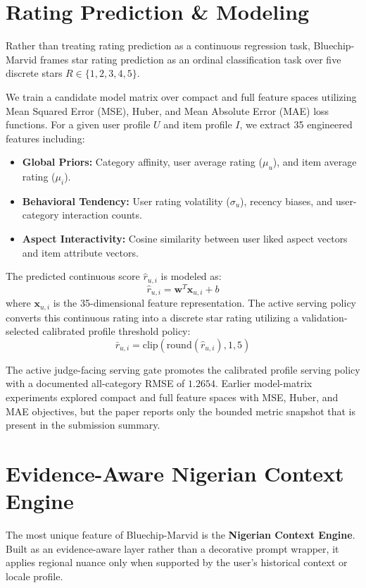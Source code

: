 \documentclass[11pt,a4paper]{article}
\begin{document}
\section{Rating Prediction \& Modeling}
Rather than treating rating prediction as a continuous regression task, Bluechip-Marvid frames star rating prediction as an ordinal classification task over five discrete stars $R \in \{1, 2, 3, 4, 5\}$. 

We train a candidate model matrix over compact and full feature spaces utilizing Mean Squared Error (MSE), Huber, and Mean Absolute Error (MAE) loss functions. For a given user profile $U$ and item profile $I$, we extract 35 engineered features including:
\begin{itemize}
    \item \textbf{Global Priors:} Category affinity, user average rating ($\mu_u$), and item average rating ($\mu_i$).
    \item \textbf{Behavioral Tendency:} User rating volatility ($\sigma_u$), recency biases, and user-category interaction counts.
    \item \textbf{Aspect Interactivity:} Cosine similarity between user liked aspect vectors and item attribute vectors.
\end{itemize}

The predicted continuous score $\hat{r}_{u,i}$ is modeled as:
\begin{equation}
\hat{r}_{u,i} = \mathbf{w}^T \mathbf{x}_{u,i} + b
\end{equation}
where $\mathbf{x}_{u,i}$ is the 35-dimensional feature representation. The active serving policy converts this continuous rating into a discrete star rating utilizing a validation-selected calibrated profile threshold policy:
\begin{equation}
\bar{r}_{u,i} = \text{clip}\left(\text{round}(\hat{r}_{u,i}), 1, 5\right)
\end{equation}

The active judge-facing serving gate promotes the calibrated profile serving policy with a documented all-category RMSE of $1.2654$. Earlier model-matrix experiments explored compact and full feature spaces with MSE, Huber, and MAE objectives, but the paper reports only the bounded metric snapshot that is present in the submission summary.

\section{Evidence-Aware Nigerian Context Engine}
The most unique feature of Bluechip-Marvid is the \textbf{Nigerian Context Engine}. Built as an evidence-aware layer rather than a decorative prompt wrapper, it applies regional nuance only when supported by the user's historical context or locale profile.
\end{document}
